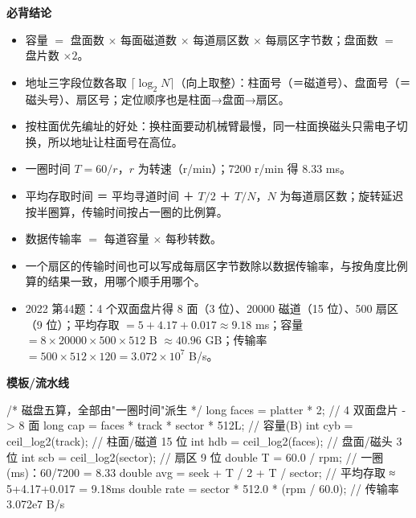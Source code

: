 \documentclass[10pt,a4paper]{ctexart}
\begin{document}




\textbf{必背结论}

\begin{itemize}

\item 容量 $=$ 盘面数 $\times$ 每面磁道数 $\times$ 每道扇区数 $\times$ 每扇区字节数；盘面数 $=$ 盘片数 $\times2$。

\item 地址三字段位数各取 $\lceil\log_2 N\rceil$（向上取整）：柱面号（＝磁道号）、盘面号（＝磁头号）、扇区号；定位顺序也是柱面→盘面→扇区。

\item 按柱面优先编址的好处：换柱面要动机械臂最慢，同一柱面换磁头只需电子切换，所以地址让柱面号在高位。

\item 一圈时间 $T=60/r$，$r$ 为转速（r/min）；7200 r/min 得 8.33 ms。

\item 平均存取时间 ＝ 平均寻道时间 ＋ $T/2$ ＋ $T/N$，$N$ 为每道扇区数；旋转延迟按半圈算，传输时间按占一圈的比例算。

\item 数据传输率 $=$ 每道容量 $\times$ 每秒转数。

\item 一个扇区的传输时间也可以写成每扇区字节数除以数据传输率，与按角度比例算的结果一致，用哪个顺手用哪个。

\item 2022 第44题：4 个双面盘片得 8 面（3 位）、20000 磁道（15 位）、500 扇区（9 位）；平均存取 $=5+4.17+0.017\approx9.18$ ms；容量 $=8\times20000\times500\times512$ B $\approx40.96$ GB；传输率 $=500\times512\times120=3.072\times10^7$ B/s。

\end{itemize}

\textbf{模板/流水线}

\begin{codebox}
/* 磁盘五算，全部由"一圈时间"派生 */
long   faces = platter * 2;                       // 4 双面盘片 -> 8 面
long   cap   = faces * track * sector * 512L;     // 容量(B)
int    cyb   = ceil_log2(track);                  // 柱面/磁道 15 位
int    hdb   = ceil_log2(faces);                  // 盘面/磁头  3 位
int    scb   = ceil_log2(sector);                 // 扇区       9 位
double T     = 60.0 / rpm;                        // 一圈(ms)：60/7200 = 8.33
double avg   = seek + T / 2 + T / sector;         // 平均存取 ≈ 5+4.17+0.017 = 9.18ms
double rate  = sector * 512.0 * (rpm / 60.0);     // 传输率 3.072e7 B/s
\end{codebox}
\end{document}
